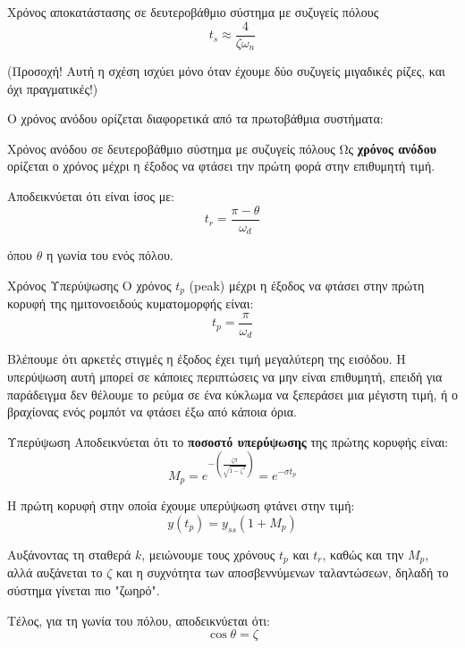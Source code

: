 \documentclass[11pt,a4paper,notitlepage,fleqn,final]{article}
\begin{document}
\begin{itemize}
	\begin{theorem}{Χρόνος αποκατάστασης σε δευτεροβάθμιο σύστημα με συζυγείς πόλους}{}
		\[
		t_s \approx \frac{4}{ζ\omega_n}
		\]
		
		({\color{red!50!black}Προσοχή!} Αυτή η σχέση ισχύει μόνο όταν έχουμε δύο συζυγείς μιγαδικές ρίζες, και όχι πραγματικές!)
	\end{theorem}
		
	Ο χρόνος ανόδου ορίζεται διαφορετικά από τα πρωτοβάθμια συστήματα:
	\begin{defn}{Χρόνος ανόδου σε δευτεροβάθμιο σύστημα με συζυγείς πόλους}{}
		Ως \textbf{χρόνος ανόδου} ορίζεται ο χρόνος μέχρι η έξοδος να φτάσει την πρώτη
		φορά στην επιθυμητή τιμή.
		
		Αποδεικνύεται ότι είναι ίσος με:
		\[
		\boxed{t_r = \frac{π-θ}{\omega_d}}
		\]
		
		όπου \( θ \) η γωνία του ενός πόλου.
	\end{defn}
	
	\begin{defn}{Χρόνος Υπερύψωσης}{}
	Ο χρόνος \( t_p \) (peak) μέχρι η έξοδος να φτάσει στην πρώτη κορυφή της ημιτονοειδούς κυματομορφής είναι:
	\[
	\boxed{t_p = \frac{π}{\omega_d}}
	\]
	\end{defn}
	
	Βλέπουμε ότι αρκετές στιγμές η έξοδος έχει τιμή μεγαλύτερη της εισόδου. Η υπερύψωση αυτή
	μπορεί σε κάποιες περιπτώσεις να μην είναι επιθυμητή, επειδή για παράδειγμα δεν θέλουμε
	το ρεύμα σε ένα κύκλωμα να ξεπεράσει μια μέγιστη τιμή, ή ο βραχίονας ενός ρομπότ να
	φτάσει έξω από κάποια όρια.
	
	\begin{defn}{Υπερύψωση}{}
		Αποδεικνύεται ότι το \textbf{ποσοστό υπερύψωσης} της πρώτης κορυφής είναι:
		\[
		M_p =
		e^{-\left(
			\frac{ζπ}{\sqrt{1-ζ^2}}
			\right)}
		= e^{-σ t_p}
		\]
		
		\tcblower
		
		Η πρώτη κορυφή στην οποία έχουμε υπερύψωση φτάνει στην τιμή:
		\[
		y\left(t_p\right) = y_{ss}(1+M_p)
		\]
	\end{defn}
	
	Αυξάνοντας τη σταθερά \( k \), μειώνουμε τους χρόνους \( t_p \) και \( t_r \), καθώς και την \( M_p \),
	αλλά αυξάνεται το \( ζ \) και η συχνότητα των αποσβεννύμενων ταλαντώσεων, δηλαδή το σύστημα γίνεται πιο "ζωηρό".
	
	Τέλος, για τη γωνία του πόλου, αποδεικνύεται ότι:
	\[
	\boxed{\cos θ = ζ}
	\]
\end{itemize}
\end{document}

